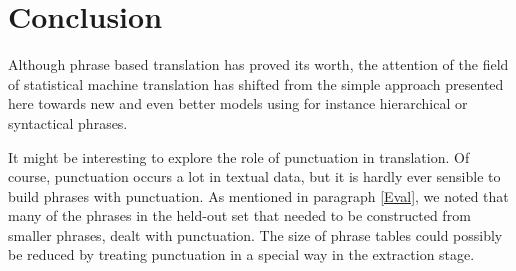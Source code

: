 \documentclass[11pt]{article}
\begin{document}

\section{Conclusion}
\label{Concl}
Although phrase based translation has proved its worth, the attention of the field of statistical machine translation has shifted from the simple approach presented here towards new and even better models using for instance hierarchical or syntactical phrases.

It might be interesting to explore the role of punctuation in translation. Of course, punctuation occurs a lot in textual data, but it is hardly ever sensible to build phrases with punctuation. As mentioned in paragraph \ref{Eval}, we noted that many of the phrases in the held-out set that needed to be constructed from smaller phrases, dealt with punctuation. The size of phrase tables could possibly be reduced by treating punctuation in a special way in the extraction stage.
\end{document}
